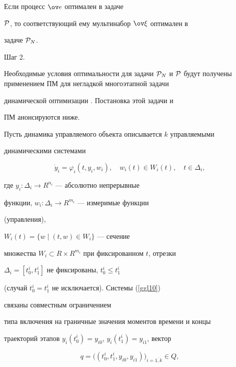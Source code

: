 \begin{prop}


Если процесс $\ov e$ оптимален в задаче


${\cal P}$, то соответствующий ему мультинабор $\ov \xi$ оптимален в


задаче ${\cal P}_N$.


\end{prop}





Шаг 2.


Необходимые условия оптимальности для задачи ${\cal P}_N$ и ${\cal


P}$ будут получены применением ПМ для негладкой многоэтапной задачи


динамической оптимизации \cite{K.B.}. Постановка этой задачи и


ПМ анонсируются ниже.





Пусть динамика управляемого объекта описывается $k$ управляемыми


динамическими системами


\begin{equation}


\Dot{y}_i=\varphi_i(t,y_i,w_i),\quad


w_i(t)\in W_i(t), \quad t\in \Delta_i,


\label{ggl10}


\end{equation}


где $y_i:\Delta_i\rightarrow R^{n_i}$ --- абсолютно непрерывные


функции, $w_i:\Delta_i\rightarrow R^{m_i}$ --- измеримые функции


(управления),


$W_i(t)=\{w\mid (t,w)\in W_i\}$ --- сечение


множества $W_i\subset R\times R^{m_i}$ при фиксированном $t$, отрезки


$\Delta_i=[t_0^i,t_1^i]$ не фиксированы, $t_0^i\leq t_1^i$


(случай $t_0^i=t_1^i$ не исключается). Системы (\ref{ggl10})


связаны совместным ограничением


типа включения на граничные значения моментов времени и концы


траекторий этапов $y_i(t_0^i)=y_{i0}$, $y_i(t_1^i)=y_{i1}$, вектор


\begin{equation}


q=\big((t_0^i,t_1^i,y_{i0},y_{i1})\big)_{i=\overline{1,k}}\in Q,


\label{ggl11}


\end{equation}


